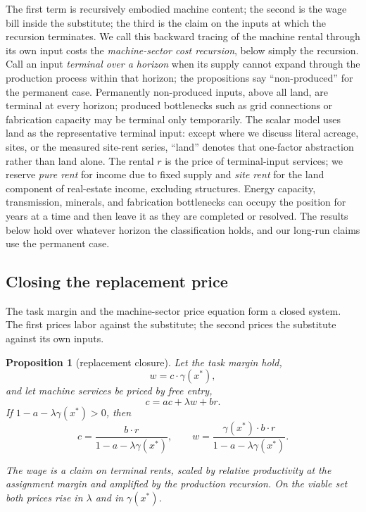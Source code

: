 \documentclass[12pt]{article}
\theoremstyle{plain}
\newtheorem{proposition}{Proposition}
\begin{document}
The first term is recursively embodied machine content; the second is the wage
bill inside the substitute; the third is the claim on the inputs at which the
recursion terminates. We call this backward tracing of the machine rental
through its own input costs the \emph{machine-sector cost recursion}, below
simply the recursion. Call an input \emph{terminal over a horizon} when its
supply cannot expand through the production process within that horizon;
the propositions say ``non-produced'' for the permanent case. Permanently
non-produced inputs, above all land, are terminal at every horizon; produced
bottlenecks such as grid connections or fabrication capacity may be terminal
only temporarily. The scalar model uses land as the representative terminal
input: except where we discuss literal acreage, sites, or the measured
site-rent series, ``land'' denotes that one-factor abstraction rather than
land alone. The rental $r$ is the price of terminal-input services; we
reserve \emph{pure rent} for income due to fixed supply and \emph{site rent}
for the land component of real-estate income, excluding structures.
Energy capacity, transmission, minerals, and fabrication bottlenecks can occupy
the position for years at a time and then leave it as they are completed or
resolved. The results below hold over whatever horizon the classification holds,
and our long-run claims use the permanent case.


\subsection{Closing the replacement price}

The task margin and the machine-sector price equation form a closed system. The
first prices labor against the substitute; the second prices the substitute
against its own inputs.

\begin{proposition}[replacement closure]\label{prop:replacement}
Let the task margin hold,
\[
w = c\cdot\gamma(x^*),
\]
and let machine services be priced by free entry,
\[
c = ac + \lambda w + br.
\]
If $1-a-\lambda\gamma(x^*)>0$, then
\begin{equation}\label{eq:closure}
c =
\frac{b\cdot r}{1-a-\lambda\gamma(x^*)},
\qquad
w =
\frac{\gamma(x^*)\cdot b\cdot r}
     {1-a-\lambda\gamma(x^*)}.
\end{equation}

The wage is a claim on terminal rents, scaled by relative productivity at the
assignment margin and amplified by the production recursion. On the viable set
both prices rise in $\lambda$ and in $\gamma(x^*)$.
\end{proposition}
\end{document}

